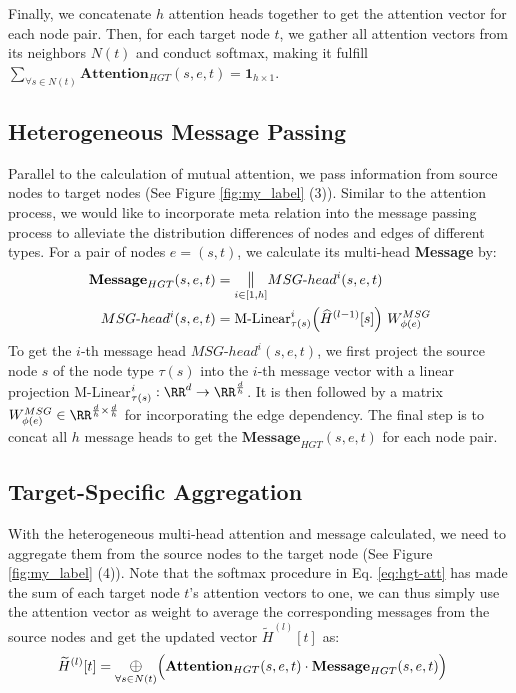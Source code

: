 \documentclass[sigconf]{acmart}
\theoremstyle{definition}
\begin{document}
{Finally, we concatenate $h$ attention heads together to get the attention vector for each node pair. 
Then, for each target node $t$, we gather all attention vectors from its neighbors $N(t)$ and conduct softmax, making it fulfill $\sum_{\forall s \in N(t)}\textbf{Attention}_{HGT}(s,e,t) = \mathbf{1}_{h \times 1}$.



\subsection{Heterogeneous Message Passing}
Parallel to the calculation of mutual attention, we pass information from source nodes to target nodes (See Figure \ref{fig:my_label} (3)). 
Similar to the attention process, we would like to incorporate meta relation into the message passing process to alleviate the distribution differences of nodes and edges of different types. For a pair of nodes $e =(s,t)$, we calculate its multi-head \textbf{Message} by:
\begin{align}
\textbf{Message}_{HGT}(s,e,t)&  = \underset{i \in [1,h]}{\mathlarger{\mathbin\Vert}}MSG\text{-}head^{i}(s,e, t)\\
MSG\text{-}head^{i}(s,e, t)&  = \text{M-Linear}^i_{\tau(s)}\Big(\widehat{H}^{(l-1)}[s]\Big) \ W^{MSG}_{\phi(e)} \nonumber
\end{align}
To get the $i$-th message head $MSG\text{-}head^{i}(s,e,t)$, we first project the source node $s$ of the node type $\tau(s)$ into the $i$-th message vector with a linear projection M-Linear$^i_{\tau(s)}: \RR^{d} \rightarrow \RR^{\frac{d}{h}}$. 
It is then followed by a matrix $W^{MSG}_{\phi(e)}\in\RR^{\frac{d}{h}\times\frac{d}{h}}$ for incorporating the edge dependency. 
The final step is to concat all $h$ message heads to get the  $\textbf{Message}_{HGT}(s,e, t)$ for each node pair.


\subsection{Target-Specific Aggregation}
With the heterogeneous multi-head attention and message calculated, we need to aggregate them from the source nodes to the target node (See Figure \ref{fig:my_label} (4)). 
Note that the softmax procedure in Eq. \ref{eq:hgt-att} has made the sum of each target node $t$'s attention vectors to one, we can thus simply use the attention vector as weight to average the corresponding messages from the source nodes and get the updated vector $\widetilde{H}^{(l)}[t]$ as:
\begin{align}
\label{eq:agg}
\widetilde{H}^{(l)}[t] &= \underset{\forall s \in N(t)}{\mathlarger{\oplus}}\Big(\textbf{Attention}_{HGT}(s, e, t) \cdot \textbf{Message}_{HGT}(s, e, t)\Big)
\end{align}

}
\end{document}
